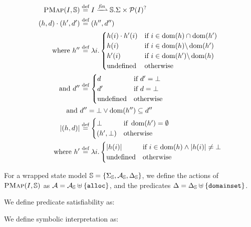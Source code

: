 \begin{align*}
	\PMap(I,\mmdl) &\defeq I \finmap \mmdl.\Sigma \times \pset(I)^?\\
	(h,d)\cdot (h',d') &\defeq (h'', d'') \\
	\text{where } h''&\defeq \lambda i.\begin{cases}
		h(i)\cdot h'(i)&\If~i\in \dom(h)\cap\dom(h')\\
		h(i) &\If~i\in \dom(h) \backslash \dom(h')\\
		h'(i) &\If~i\in \dom(h') \backslash \dom(h)\\
		\text{undefined}&\Otherwise
	\end{cases}\\
	\text{and }d''&\defeq\begin{cases}
		d&\If~d'=\bot\\
		d'&\If~d=\bot\\
		\text{undefined}&\Otherwise
	\end{cases}\\
	\text{and }& d'' = \bot \lor \dom(h'')\subseteq d''\\
	|(h, d)| &\defeq \begin{cases}
		\bot &\If~\dom(h')=\emptyset\\
		(h', \bot) &\Otherwise
	\end{cases}\\
	\text{where }h'&\defeq \lambda i.\begin{cases}
		|h(i)| &\If~ i\in\dom(h) \land |h(i)| \neq \bot\\
		\text{undefined} &\Otherwise
	\end{cases}
\end{align*}

For a wrapped state model $\mathbb S=\{\Sigma_{\mathbb S},{\cal{A}}_{\mathbb S},\Delta_{\mathbb S}\}$, we define the actions of $\textsc{PMap}(I,\mathbb S)$ as ${\cal{A}}={\cal{A}}_{\mathbb S} \uplus \{\texttt{alloc}\}$, and the predicates $\Delta=\Delta_{\mathbb S}\uplus\{\texttt{domainset}\}$.
  
We define predicate satisfiability as:

We define symbolic interpretation as:

